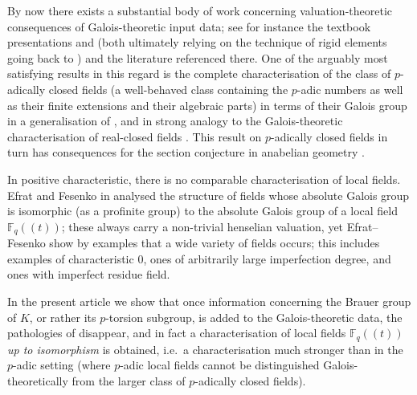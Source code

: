 \documentclass[a4paper, british, oneside]{amsart}
\newcommand{\F}{\mathbb{F}}
\newcommand{\pow}[1]{(\!(#1)\!)}
\theoremstyle{definition}
\theoremstyle{remark}
\begin{document}
By now there exists a substantial body of work concerning
valuation-theoretic consequences of Galois-theoretic input data;
see for instance the textbook presentations
\cite[§5.4]{EnglerPrestel} and \cite[Chapter 26]{Efrat_ValuationsOrderingsMilnorKTheory}
(both ultimately relying on the technique of rigid elements going back to \cite{Ware_rigid, ArasonElmanJacob_rigid})
and the literature referenced there.
One of the arguably most satisfying results in this regard is the complete
characterisation of the class of $p$-adically closed fields
(a well-behaved class containing the $p$-adic numbers as well as their
finite extensions and their algebraic parts)
in terms of their Galois group \cite{Pop_GaloisscheKennzeichnung, Efrat_GaloisCharacterization, Koenigsmann_rigidElementsValuationsGaloisCharacterization}
in a generalisation of \cite[Theorem 1]{Neukirch_KennzeichnungPAdischEndlichAlgebraisch},
and in strong analogy to the Galois-theoretic characterisation
of real-closed fields \cite{ArtinSchreier_KennzeichnungReellAbgeschlossen}.
This result on $p$-adically closed fields in turn has consequences
for the section conjecture in anabelian geometry \cite{Koenigsmann_SectionConjecture}.

In positive characteristic, there is no comparable characterisation of local fields.
Efrat and Fesenko in \cite{EfratFesenko} analysed the structure of fields whose absolute Galois group is isomorphic (as a profinite group) to the absolute Galois group of a local field $\F_q\pow{t}$;
these always carry a non-trivial henselian valuation,
yet Efrat--Fesenko show by examples that a wide variety of fields occurs;
this includes examples of characteristic $0$,
ones of arbitrarily large imperfection degree,
and ones with imperfect residue field.


In the present article we show that once information concerning the Brauer group of $K$,
or rather its $p$-torsion subgroup,
is added to the Galois-theoretic data,
the pathologies of \cite{EfratFesenko} disappear,
and in fact a characterisation of local fields $\F_q\pow{t}$
\emph{up to isomorphism} is obtained,
i.e.\ a characterisation much stronger than in the $p$-adic setting
(where $p$-adic local fields cannot be distinguished Galois-theoretically from
the larger class of $p$-adically closed fields).
\end{document}
